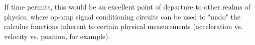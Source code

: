 If time permits, this would be an excellent point of departure to other realms of physics, where op-amp signal conditioning circuits can be used to "undo" the calculus functions inherent to certain physical measurements (acceleration vs. velocity vs. position, for example).




